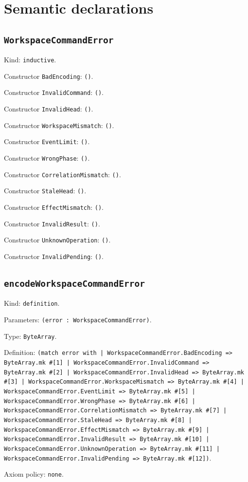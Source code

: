 \documentclass[11pt]{article}
\begin{document}
\section*{Semantic declarations}
\subsection*{\texttt{WorkspaceCommandError}}
\noindent Kind: \texttt{inductive}.\par
\noindent Constructor \texttt{BadEncoding}: \texttt{()}.\par
\noindent Constructor \texttt{InvalidCommand}: \texttt{()}.\par
\noindent Constructor \texttt{InvalidHead}: \texttt{()}.\par
\noindent Constructor \texttt{WorkspaceMismatch}: \texttt{()}.\par
\noindent Constructor \texttt{EventLimit}: \texttt{()}.\par
\noindent Constructor \texttt{WrongPhase}: \texttt{()}.\par
\noindent Constructor \texttt{CorrelationMismatch}: \texttt{()}.\par
\noindent Constructor \texttt{StaleHead}: \texttt{()}.\par
\noindent Constructor \texttt{EffectMismatch}: \texttt{()}.\par
\noindent Constructor \texttt{InvalidResult}: \texttt{()}.\par
\noindent Constructor \texttt{UnknownOperation}: \texttt{()}.\par
\noindent Constructor \texttt{InvalidPending}: \texttt{()}.\par
\subsection*{\texttt{encodeWorkspaceCommandError}}
\noindent Kind: \texttt{definition}.\par
\noindent Parameters: \texttt{(error : WorkspaceCommandError)}.\par
\noindent Type: \texttt{ByteArray}.\par
\noindent Definition: \texttt{(match error with | WorkspaceCommandError.BadEncoding => ByteArray.mk \#[1] | WorkspaceCommandError.InvalidCommand => ByteArray.mk \#[2] | WorkspaceCommandError.InvalidHead => ByteArray.mk \#[3] | WorkspaceCommandError.WorkspaceMismatch => ByteArray.mk \#[4] | WorkspaceCommandError.EventLimit => ByteArray.mk \#[5] | WorkspaceCommandError.WrongPhase => ByteArray.mk \#[6] | WorkspaceCommandError.CorrelationMismatch => ByteArray.mk \#[7] | WorkspaceCommandError.StaleHead => ByteArray.mk \#[8] | WorkspaceCommandError.EffectMismatch => ByteArray.mk \#[9] | WorkspaceCommandError.InvalidResult => ByteArray.mk \#[10] | WorkspaceCommandError.UnknownOperation => ByteArray.mk \#[11] | WorkspaceCommandError.InvalidPending => ByteArray.mk \#[12])}.\par
\noindent Axiom policy: \texttt{none}.\par
\end{document}
